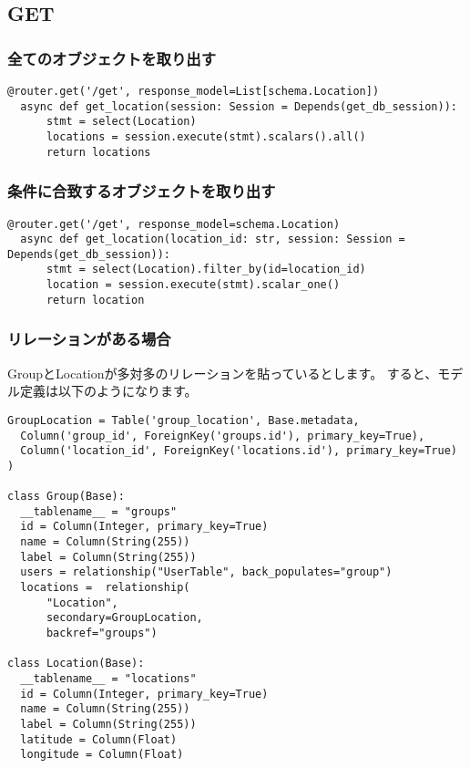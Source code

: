 \subsection{GET}

\subsubsection*{全てのオブジェクトを取り出す}

\begin{lstlisting}[caption=Get Location List]
  @router.get('/get', response_model=List[schema.Location])
  async def get_location(session: Session = Depends(get_db_session)):
      stmt = select(Location)
      locations = session.execute(stmt).scalars().all()
      return locations
  \end{lstlisting}
  

\subsubsection*{条件に合致するオブジェクトを取り出す}

\begin{lstlisting}[caption=Get Location on condition]
  @router.get('/get', response_model=schema.Location)
  async def get_location(location_id: str, session: Session = Depends(get_db_session)):
      stmt = select(Location).filter_by(id=location_id)
      location = session.execute(stmt).scalar_one()
      return location
\end{lstlisting}

\subsubsection*{リレーションがある場合}
GroupとLocationが多対多のリレーションを貼っているとします。
すると、モデル定義は以下のようになります。
\begin{lstlisting}[caption=モデル定義]
GroupLocation = Table('group_location', Base.metadata,
  Column('group_id', ForeignKey('groups.id'), primary_key=True),
  Column('location_id', ForeignKey('locations.id'), primary_key=True)
)

class Group(Base):
  __tablename__ = "groups"
  id = Column(Integer, primary_key=True)
  name = Column(String(255))
  label = Column(String(255))
  users = relationship("UserTable", back_populates="group")
  locations =  relationship(
      "Location",
      secondary=GroupLocation,
      backref="groups")

class Location(Base):
  __tablename__ = "locations"
  id = Column(Integer, primary_key=True)
  name = Column(String(255))
  label = Column(String(255))
  latitude = Column(Float)
  longitude = Column(Float)
\end{lstlisting}

